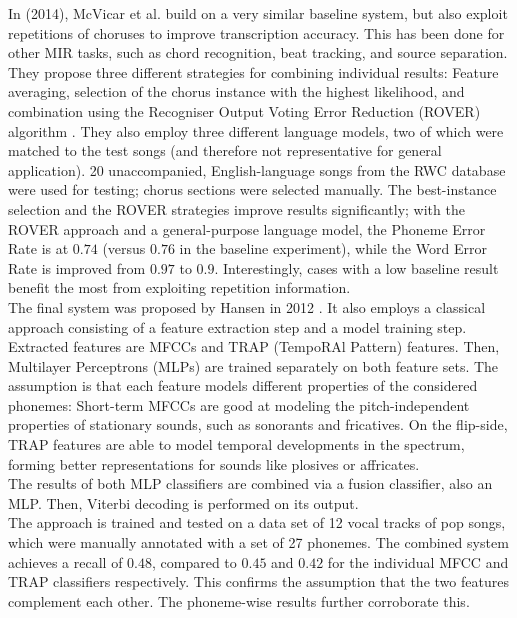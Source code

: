 In \cite{McVicar2014} (2014), McVicar et al. build on a very similar baseline system, but also exploit repetitions of choruses to improve transcription accuracy. This has been done for other MIR tasks, such as chord recognition, beat tracking, and source separation. They propose three different strategies for combining individual results: Feature averaging, selection of the chorus instance with the highest likelihood, and combination using the Recogniser Output Voting Error Reduction (ROVER) algorithm \cite{rover}. They also employ three different language models, two of which were matched to the test songs (and therefore not representative for general application). 20 unaccompanied, English-language songs from the RWC database \cite{rwc} were used for testing; chorus sections were selected manually. The best-instance selection and the ROVER strategies improve results significantly; with the ROVER approach and a general-purpose language model, the Phoneme Error Rate is at $0.74$ (versus $0.76$ in the baseline experiment), while the Word Error Rate is improved from $0.97$ to $0.9$. Interestingly, cases with a low baseline result benefit the most from exploiting repetition information.\\

The final system was proposed by Hansen in 2012 \cite{jens}. It also employs a classical approach consisting of a feature extraction step and a model training step. Extracted features are MFCCs and TRAP (TempoRAl Pattern) features. Then, Multilayer Perceptrons (MLPs) are trained separately on both feature sets. The assumption is that each feature models different properties of the considered phonemes: Short-term MFCCs are good at modeling the pitch-independent properties of stationary sounds, such as sonorants and fricatives. On the flip-side, TRAP features are able to model temporal developments in the spectrum, forming better representations for sounds like plosives or affricates.\\
The results of both MLP classifiers are combined via a fusion classifier, also an MLP. Then, Viterbi decoding is performed on its output.\\
The approach is trained and tested on a data set of 12 vocal tracks of pop songs, which were manually annotated with a set of 27 phonemes. The combined system achieves a recall of $0.48$, compared to $0.45$ and $0.42$ for the individual MFCC and TRAP classifiers respectively. This confirms the assumption that the two features complement each other. The phoneme-wise results further corroborate this.

